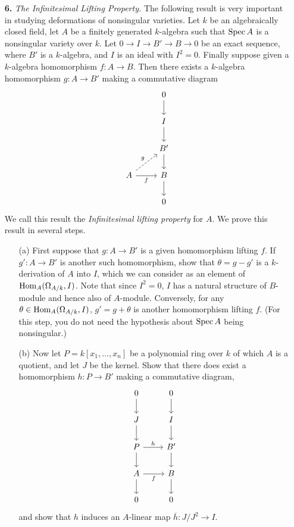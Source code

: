 \documentclass{article}
\begin{document}
\begin{enumerate} [label=\textbf{\arabic*.}, leftmargin=0em]
\item[\textbf{6.}] \textit{The Infinitesimal Lifting Property.} The following result is very important in studying deformations of nonsingular varieties.
Let $k$ be an algebraically closed field, let $A$ be a finitely generated $k$-algebra such that $\operatorname{Spec}{A}$ is a nonsingular variety over $k$.
Let $0 \to I \to B' \to B \to 0$ be an exact sequence, where $B'$ is a $k$-algebra, and $I$ is an ideal with $I^2 = 0$.
Finally suppose given a $k$-algebra homomorphism $f : A \to B$. Then there exists a $k$-algebra homomorphism $g : A \to B'$ making a commutative diagram
\[ \begin{tikzcd}
    & 0 \arrow[d]  \\
    & I \arrow[d]  \\
    & B' \arrow[d] \\
A \arrow[r, "f"'] \arrow[ru, "g", dashed] & B \arrow[d]  \\
    & 0           
\end{tikzcd} \]
We call this result the \textit{Infinitesimal lifting property} for $A$. We prove this result in several steps.
\begin{itemize}
    \item[(a)] First suppose that $g : A \to B'$ is a given homomorphism lifting $f$. If $g' : A \to B'$ is another such homomorphism, show that $\theta = g - g'$ is a $k$-derivation of $A$ into $I$, which we can consider as an element of $\operatorname{Hom}_A(\Omega_{A / k}, I)$. Note that since $I^2 = 0$, $I$ has a natural structure of $B$-module and hence also of $A$-module. Conversely, for any $\theta \in \operatorname{Hom}_A(\Omega_{A/k}, I)$, $g' = g + \theta$ is another homomorphism lifting $f$. (For this step, you do not need the hypothesis about $\operatorname{Spec}{A}$ being nonsingular.)
    
    \item[(b)] Now let $P = k[x_1, \dots, x_n]$ be a polynomial ring over $k$ of which $A$ is a quotient, and let $J$ be the kernel. Show that there does exist a homomorphism $h : P \to B'$ making a commutative diagram,
    \[ \begin{tikzcd}
        0 \arrow[d]                 & 0 \arrow[d]  \\
        J \arrow[d]                 & I \arrow[d]  \\
        P \arrow[d] \arrow[r, "h"]  & B' \arrow[d] \\
        A \arrow[d] \arrow[r, "f"'] & B \arrow[d]  \\
        0                           & 0           
        \end{tikzcd} \]
    and show that $h$ induces an $A$-linear map $\overline{h} : J / J^2 \to I$.
    

\end{itemize}
\end{enumerate}
\end{document}
